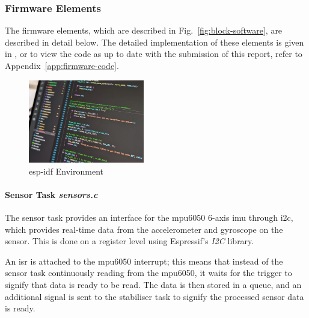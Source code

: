 \subsubsection{Firmware Elements}

The firmware elements, which are described in Fig.~\ref{fig:block-software}, are described in detail below. The detailed implementation of these elements is given in \cite{flightcontroller_git}, or to view the code as up to date with the submission of this report, refer to Appendix~\ref{app:firmware-code}.

\begin{figure}[H]
    \centering
    \captionsetup{justification=centering, margin=1cm}
    \includegraphics[width=0.45\textwidth]{img/firmware-flavour2.jpeg}
    \caption{\gls{esp-idf} Environment}
    \label{fig:frame}
\end{figure}

\paragraph{\textbf{Sensor Task} \textit{sensors.c}} \leavevmode

The sensor task provides an interface for the \gls{mpu6050} 6-axis \gls{imu} through \gls{i2c}, which provides real-time data from the accelerometer and gyroscope on the sensor. This is done on a register level using Espressif's \textit{I2C} library.

An \gls{isr} is attached to the \gls{mpu6050} interrupt; this means that instead of the sensor task continuously reading from the \gls{mpu6050}, it waits for the trigger to signify that data is ready to be read. The data is then stored in a queue, and an additional signal is sent to the stabiliser task to signify the processed sensor data is ready.

